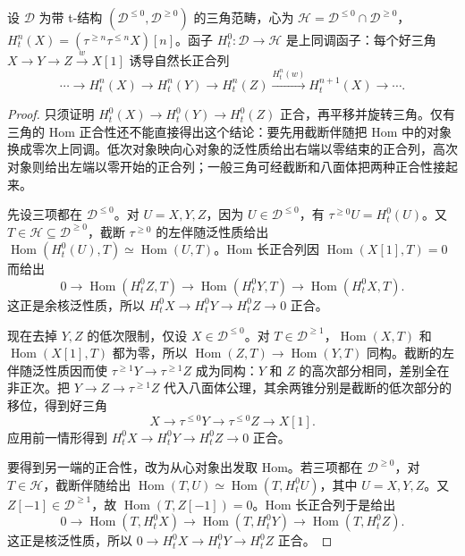 \begin{theorem}\label{b4:thm:t-cohomology-exact}
	设 \(\mathcal D\) 为带 t-结构 \((\mathcal D^{\le0},\mathcal D^{\ge0})\) 的三角范畴，心为 \(\mathcal H=\mathcal D^{\le0}\cap\mathcal D^{\ge0}\)，\(H_t^n(X)=(\tau^{\ge n}\tau^{\le n}X)[n]\)。函子 \(H_t^0:\mathcal D\to\mathcal H\) 是上同调函子：每个好三角 \(X\to Y\to Z\xrightarrow{w}X[1]\) 诱导自然长正合列
	\[
		\cdots\longrightarrow H_t^n(X)\longrightarrow H_t^n(Y) \longrightarrow H_t^n(Z)\xrightarrow{H_t^n(w)}H_t^{n+1}(X) \longrightarrow\cdots.
	\]
\end{theorem}
\begin{proof}
	只须证明 \(H_t^0(X)\to H_t^0(Y)\to H_t^0(Z)\) 正合，再平移并旋转三角。仅有三角的 Hom 正合性还不能直接得出这个结论：要先用截断伴随把 Hom 中的对象换成零次上同调。低次对象映向心对象的泛性质给出右端以零结束的正合列，高次对象则给出左端以零开始的正合列；一般三角可经截断和八面体把两种正合性接起来。

	先设三项都在 \(\mathcal D^{\le0}\)。对 \(U=X,Y,Z\)，因为 \(U\in\mathcal D^{\le0}\)，有 \(\tau^{\ge0}U=H_t^0(U)\)。又 \(T\in\mathcal H\subseteq\mathcal D^{\ge0}\)，截断 \(\tau^{\ge0}\) 的左伴随泛性质给出 \(\operatorname{Hom}(H_t^0(U),T)\simeq\operatorname{Hom}(U,T)\)。Hom 长正合列因 \(\operatorname{Hom}(X[1],T)=0\) 而给出
	\[
		0\longrightarrow\operatorname{Hom}(H_t^0Z,T) \longrightarrow\operatorname{Hom}(H_t^0Y,T) \longrightarrow\operatorname{Hom}(H_t^0X,T).
	\]
	这正是余核泛性质，所以 \(H_t^0X\to H_t^0Y\to H_t^0Z\to0\) 正合。

	现在去掉 \(Y,Z\) 的低次限制，仅设 \(X\in\mathcal D^{\le0}\)。对 \(T\in\mathcal D^{\ge1}\)，\(\operatorname{Hom}(X,T)\) 和 \(\operatorname{Hom}(X[1],T)\) 都为零，所以 \(\operatorname{Hom}(Z,T)\to\operatorname{Hom}(Y,T)\) 同构。截断的左伴随泛性质因而使 \(\tau^{\ge1}Y\to\tau^{\ge1}Z\) 成为同构：\(Y\) 和 \(Z\) 的高次部分相同，差别全在非正次。把 \(Y\to Z\to\tau^{\ge1}Z\) 代入八面体公理，其余两锥分别是截断的低次部分的移位，得到好三角
	\[
		X\longrightarrow\tau^{\le0}Y\longrightarrow\tau^{\le0}Z\longrightarrow X[1].
	\]
	应用前一情形得到 \(H_t^0X\to H_t^0Y\to H_t^0Z\to0\) 正合。

	要得到另一端的正合性，改为从心对象出发取 Hom。若三项都在 \(\mathcal D^{\ge0}\)，对 \(T\in\mathcal H\)，截断伴随给出 \(\operatorname{Hom}(T,U)\simeq\operatorname{Hom}(T,H_t^0U)\)，其中 \(U=X,Y,Z\)。又 \(Z[-1]\in\mathcal D^{\ge1}\)，故 \(\operatorname{Hom}(T,Z[-1])=0\)。Hom 长正合列于是给出
	\[
		0\longrightarrow\operatorname{Hom}(T,H_t^0X) \longrightarrow\operatorname{Hom}(T,H_t^0Y) \longrightarrow\operatorname{Hom}(T,H_t^0Z).
	\]
	这正是核泛性质，所以 \(0\to H_t^0X\to H_t^0Y\to H_t^0Z\) 正合。


\end{proof}

